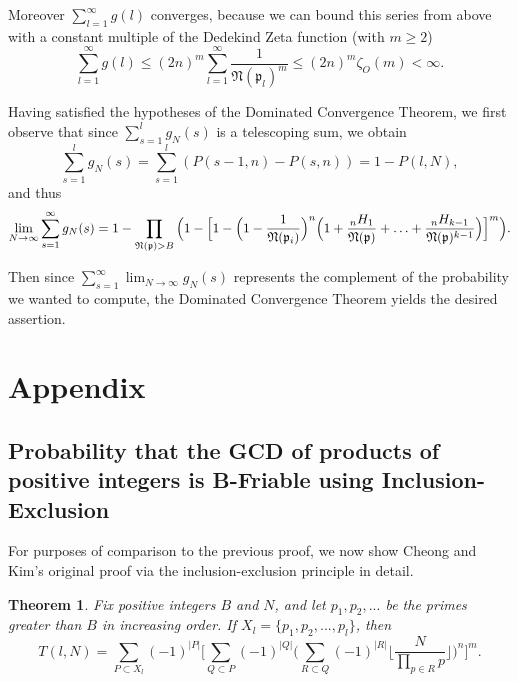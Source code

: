 \documentclass[12pt]{amsart}
\newtheorem{theorem}{Theorem}[subsection]
\theoremstyle{definition}
\newcommand{\f}[1]{\mathfrak{#1}}
\begin{document}
 Moreover $\sum_{l=1}^{\infty} g(l)$ converges, because we can bound this series from above with a constant multiple of the Dedekind Zeta function (with $m\geq 2$) $$ \sum_{l=1}^{\infty}g(l)\leq(2n)^m\sum_{l=1}^{\infty}\frac{1}{\f{N}(\f{p}_l)^m}\leq (2n)^m\zeta_O(m)< \infty.$$

Having satisfied the hypotheses of the Dominated Convergence Theorem, we first observe that since $\sum_{s=1}^l g_N(s)$ is a telescoping sum, we obtain
$$\sum_{s=1}^l g_N(s) = \sum_{s=1}^l (P(s-1, n) - P(s, n)) = 1 - P(l, N),$$ 
and thus
$$\lim_{N \to \infty} \sum_{s=1}^{\infty} g_N(s) = 1 - \prod_{\f{N}(\f{p}) > B} \Big(1 - \Big[1 - \Big(1-\frac{1}{\f{N}(\f{p}_i)}\Big)^n \Big(1 + \frac{{}_nH_1}{\f{N}(\f{p})} + \mathellipsis + \frac{{}_nH_{k-1}}{\f{N}(\f{p})^{k-1}}\Big)\Big]^m\Big).$$

\noindent Then since $\displaystyle \sum_{s=1}^{\infty} \lim_{N \to \infty} g_N(s)$ represents the complement of the probability we wanted to compute, the Dominated Convergence Theorem yields the desired assertion.

\section{Appendix}
\subsection{Probability that the GCD of products of positive integers is  B-Friable using Inclusion-Exclusion}
For purposes of comparison to the previous proof, we now show Cheong and Kim's original proof via the inclusion-exclusion principle in detail.
\begin{theorem}
	Fix positive integers $B$ and $N$, and let $p_1, p_2, ...$ be the primes greater than $B$ in increasing order. If $X_l = \{p_1, p_2, ..., p_l\}$, then
	$$T(l,N)=\sum_{P\subset X_l}{(-1)^{|P|}} \Bigg[\sum_{Q\subset P}(-1)^{|Q|} \Big(\sum_{R\subset Q}(-1)^{|R|}\Big\lfloor\frac{N}{\prod_{p\in R} p}\Big\rfloor\Big)^n\Bigg]^m.$$
\end{theorem}
\end{document}
